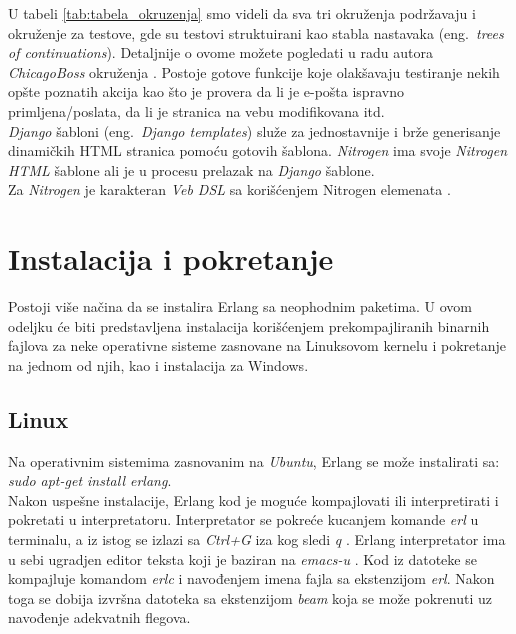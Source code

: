 \documentclass[a4paper]{article}
\begin{document}
{U tabeli \ref{tab:tabela_okruzenja} smo videli da sva tri okruženja podržavaju i okruženje za testove, gde su testovi struktuirani kao stabla nastavaka (eng.~{\em trees of continuations}). Detaljnije o ovome možete pogledati u radu autora {\em ChicagoBoss} okruženja \cite{EvanMillerTesting}. Postoje gotove funkcije koje olakšavaju testiranje nekih opšte poznatih akcija kao što je provera da li je e-pošta ispravno primljena/poslata, da li je stranica na vebu modifikovana itd. \\

{\em Django} šabloni (eng.~{\em Django templates}) \cite{DjangoTempDoc} služe za jednostavnije i brže generisanje dinamičkih HTML stranica pomoću gotovih šablona. {\em Nitrogen} ima svoje {\em Nitrogen HTML} šablone ali je u procesu prelazak na {\em Django} šablone. \\

Za {\em Nitrogen} je karakteran {\em Veb DSL} \cite{WebDSL} sa korišćenjem Nitrogen elemenata \cite{NitrogenDocumentation} .




\section{Instalacija i pokretanje}
\label{sec:instalacija}

Postoji više načina da se instalira Erlang sa neophodnim paketima.
U ovom odeljku će biti predstavljena instalacija korišćenjem prekompajliranih binarnih fajlova 
za neke operativne sisteme zasnovane na Linuksovom kernelu i pokretanje na jednom od njih, kao 
i instalacija za Windows.

\subsection{Linux}
\label{subsec:instalacijaLinux}

Na operativnim sistemima zasnovanim na {\em Ubuntu}, Erlang se može instalirati sa:
{\em sudo apt-get install erlang}. \\

Nakon uspešne instalacije, Erlang kod je moguće kompajlovati
ili interpretirati i pokretati u interpretatoru.
Interpretator se pokreće kucanjem komande {\em erl} u terminalu, a iz istog
se izlazi sa {\em Ctrl+G} iza kog sledi {\em q} \cite{book_joe}.
Erlang interpretator ima u sebi ugradjen editor teksta koji je baziran na {\em emacs-u} \cite{book_fred}.
Kod iz datoteke se kompajluje komandom {\em erlc} i navođenjem imena fajla sa ekstenzijom {\em erl}.
Nakon toga se dobija izvršna datoteka sa ekstenzijom {\em beam} koja se može
pokrenuti uz navođenje adekvatnih flegova. 

}
\end{document}
